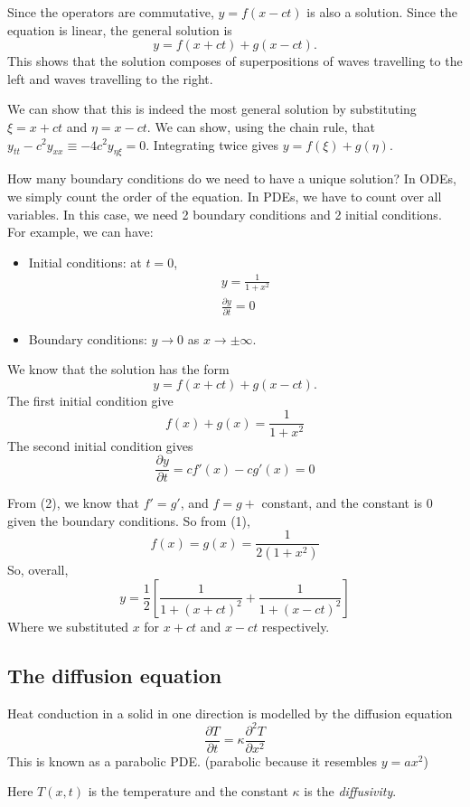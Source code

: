 \documentclass[a4paper]{article}
\begin{document}
Since the operators are commutative, $y = f(x - ct)$ is also a solution. Since the equation is linear, the general solution is
\[
y = f(x + ct) + g(x - ct).
\]
This shows that the solution composes of superpositions of waves travelling to the left and waves travelling to the right.

\note We can show that this is indeed the most general solution by substituting $\xi = x + ct$ and $\eta = x - ct$. We can show, using the chain rule, that $y_{tt} - c^2 y_{xx} \equiv -4c^2 y_{\eta\xi} = 0$. Integrating twice gives $y = f(\xi) + g(\eta)$.

How many boundary conditions do we need to have a unique solution? In ODEs, we simply count the order of the equation. In PDEs, we have to count over all variables. In this case, we need 2 boundary conditions and 2 initial conditions. For example, we can have:
\begin{itemize}
\item Initial conditions: at $t = 0$,
  \begin{gather*}
    y = \frac{1}{1 + x^2}\\
    \frac{\partial y}{\partial t} = 0
  \end{gather*}
\item Boundary conditions: $y \to 0$ as $x \to \pm \infty$.
\end{itemize}
We know that the solution has the form 
\[
y = f(x + ct) + g(x - ct).
\]
The first initial condition give
\[
f(x) + g(x) = \frac{1}{1 + x^2}\tag{1}
\]
The second initial condition gives
\[
\frac{\partial y}{\partial t} = cf'(x) - cg'(x)\tag{2} = 0
\]

From (2), we know that $f' = g'$, and $f = g + $ constant, and the constant is $0$ given the boundary conditions. So from (1),
\[
f(x) = g(x) = \frac{1}{2(1 + x^2)}
\]
So, overall,
\[
y = \frac{1}{2}\left[\frac{1}{1 + (x + ct)^2} + \frac{1}{1 + (x - ct)^2}\right]
\]
Where we substituted $x$ for $x +ct$ and $x - ct$ respectively.

\subsection{The diffusion equation}
Heat conduction in a solid in one direction is modelled by the diffusion equation
\[
\frac{\partial T}{\partial t} = \kappa \frac{\partial^2 T}{\partial x^2}
\]
This is known as a parabolic PDE. (parabolic because it resembles $y = ax^2$)

Here $T(x, t)$ is the temperature and the constant $\kappa$ is the \emph{diffusivity}.
\end{document}
